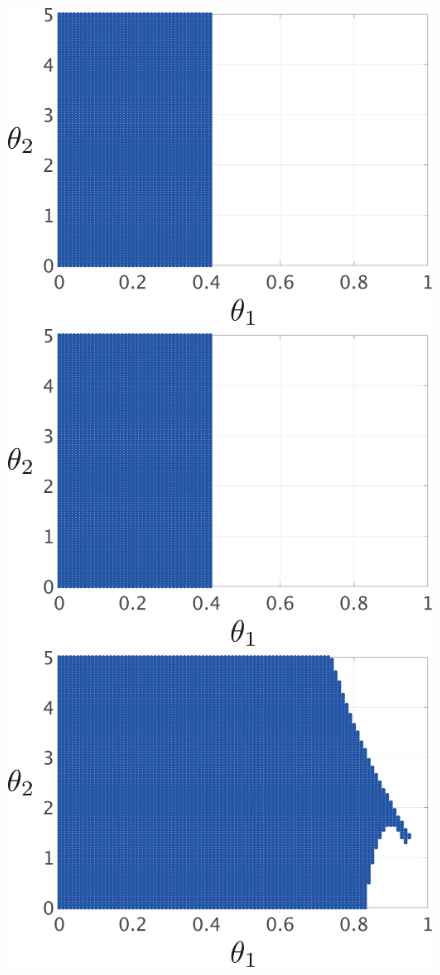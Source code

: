 \documentclass[graybox, envcountchap]{svmult}
\begin{document}
\begin{figure}[t!]
  \centering
  {
  \begin{minipage}{0.49\linewidth}
    \centering
    \includegraphics[width = 0.90\linewidth]{figs/Y1D1}
    \medskip
  \end{minipage}
  \begin{minipage}{0.49\linewidth}
    \centering
    \includegraphics[width = 0.90\linewidth]{figs/Y1D0.01}
    \medskip
  \end{minipage}
}
  \centering
  {
  \begin{minipage}{0.49\linewidth}
      \centering
    \includegraphics[width = 0.90\linewidth]{figs/Y0.01D1}

\end{minipage}}
\end{figure}
\end{document}
